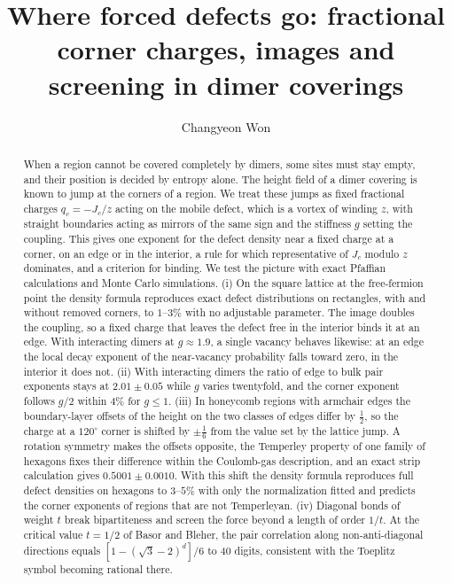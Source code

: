 \documentclass[aps,pre,twocolumn,superscriptaddress,nofootinbib,floatfix]{revtex4-2}
\begin{document}
\title{Where forced defects go: fractional corner charges, images and screening in dimer coverings}

\author{Changyeon Won}

\begin{abstract}
When a region cannot be covered completely by dimers, some sites must stay empty, and their position is decided by entropy alone. The height field of a dimer covering is known to jump at the corners of a region. We treat these jumps as fixed fractional charges $q_c=-J_c/z$ acting on the mobile defect, which is a vortex of winding $z$, with straight boundaries acting as mirrors of the same sign and the stiffness $g$ setting the coupling. This gives one exponent for the defect density near a fixed charge at a corner, on an edge or in the interior, a rule for which representative of $J_c$ modulo $z$ dominates, and a criterion for binding. We test the picture with exact Pfaffian calculations and Monte Carlo simulations. (i) On the square lattice at the free-fermion point the density formula reproduces exact defect distributions on rectangles, with and without removed corners, to $1$--$3\%$ with no adjustable parameter. The image doubles the coupling, so a fixed charge that leaves the defect free in the interior binds it at an edge. With interacting dimers at $g\approx1.9$, a single vacancy behaves likewise: at an edge the local decay exponent of the near-vacancy probability falls toward zero, in the interior it does not. (ii) With interacting dimers the ratio of edge to bulk pair exponents stays at $2.01\pm0.05$ while $g$ varies twentyfold, and the corner exponent follows $g/2$ within $4\%$ for $g\le1$. (iii) In honeycomb regions with armchair edges the boundary-layer offsets of the height on the two classes of edges differ by $\tfrac12$, so the charge at a $120^\circ$ corner is shifted by $\pm\tfrac16$ from the value set by the lattice jump. A rotation symmetry makes the offsets opposite, the Temperley property of one family of hexagons fixes their difference within the Coulomb-gas description, and an exact strip calculation gives $0.5001\pm0.0010$. With this shift the density formula reproduces full defect densities on hexagons to $3$--$5\%$ with only the normalization fitted and predicts the corner exponents of regions that are not Temperleyan. (iv) Diagonal bonds of weight $t$ break bipartiteness and screen the force beyond a length of order $1/t$. At the critical value $t=1/2$ of Basor and Bleher, the pair correlation along non-anti-diagonal directions equals $[1-(\sqrt3-2)^{d}]/6$ to 40 digits, consistent with the Toeplitz symbol becoming rational there.
\end{abstract}
\end{document}
